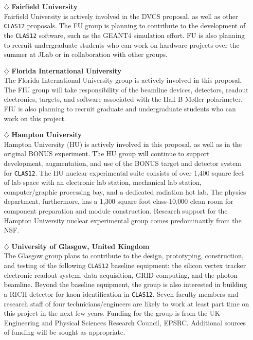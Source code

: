 \vskip 0.4cm

\noindent
$\diamondsuit$ {\bf Fairfield University} \\[0.2ex]

\noindent
Fairfield University is actively involved in the DVCS proposal, as well as 
other {\tt CLAS12} proposals.  The FU group is planning to contribute to 
the development of the {\tt CLAS12} software, such as the GEANT4 simulation
effort.  FU is also planning to recruit undergraduate students who can work 
on hardware projects over the summer at JLab or in collaboration with other 
groups.

\vskip 0.4cm

\noindent
$\diamondsuit$ {\bf Florida International University} \\[0.2ex]

\noindent
The Florida International University group is actively involved in this 
proposal.  The FIU group will take responsibility of the beamline devices,
detectors, readout electronics, targets, and software associated with the 
Hall B M{\o}ller polarimeter.  FIU is also planning to recruit graduate
and undergraduate students who can work on this project. 

\vskip 0.4cm

\noindent
$\diamondsuit$ {\bf Hampton University} \\[0.2ex]

\noindent
Hampton University (HU) is actively involved in this proposal, as well as
in the original BONUS experiment.  The HU group will continue to support 
development, augmentation, and use of the BONUS target and detector system 
for {\tt CLAS12}.  The HU nuclear experimental suite consists of over 1,400 
square feet of lab space with an electronic lab station, mechanical lab 
station, computer/graphic processing bay, and a dedicated radiation hot lab. 
The physics department, furthermore, has a 1,300 square foot class-10,000
clean room for component preparation and module construction. 
Research support for the Hampton University nuclear experimental group
comes predominantly from the NSF.

\vskip 0.4cm

\noindent
$\diamondsuit$ {\bf University of Glasgow, United Kingdom} \\[0.2ex]

\noindent
The Glasgow group plans to contribute to the design, prototyping,
construction, and testing of the following {\tt CLAS12} baseline equipment:
the silicon vertex tracker electronic readout system, data acquisition,
GRID computing, and the photon beamline. Beyond the baseline equipment, the
group is also interested in building a RICH detector for kaon identification 
in {\tt CLAS12}.  Seven faculty members and research staff of four 
technicians/engineers are likely to work at least part time on this project 
in the next few years. Funding for the group is from the UK Engineering and 
Physical Sciences Research Council, EPSRC.  Additional sources of funding 
will be sought as appropriate.

